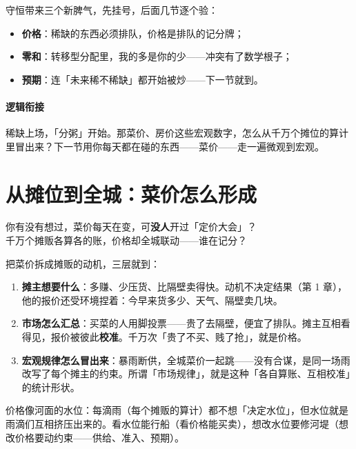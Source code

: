 \documentclass[../../main2.tex]{subfiles}
\begin{document}
守恒带来三个新脾气，先挂号，后面几节逐个验：

\begin{itemize}
	\item \textbf{价格}：稀缺的东西必须排队，价格是排队的记分牌；
	\item \textbf{零和}：转移型分配里，我的多是你的少——冲突有了数学根子；
	\item \textbf{预期}：连「未来稀不稀缺」都开始被炒——下一节就到。
\end{itemize}

\paragraph*{逻辑衔接}
	稀缺上场，「分粥」开始。那菜价、房价这些宏观数字，怎么从千万个摊位的算计里冒出来？下一节用你每天都在碰的东西——菜价——走一遍微观到宏观。

\section{从摊位到全城：菜价怎么形成}

\begin{readingnote}
	你有没有想过，菜价每天在变，可\textbf{没人}开过「定价大会」？\\
	千万个摊贩各算各的账，价格却全城联动——谁在记分？
\end{readingnote}

把菜价拆成摊贩的动机，三层就到：

\begin{enumerate}
	\item \textbf{摊主想要什么}：多赚、少压货、比隔壁卖得快。动机不决定结果（第 1 章），他的报价还受环境捏着：今早来货多少、天气、隔壁卖几块。
	\item \textbf{市场怎么汇总}：买菜的人用脚投票——贵了去隔壁，便宜了排队。摊主互相看得见，报价被彼此\textbf{校准}。千万次「贵了不买、贱了抢」，就是价格。
	\item \textbf{宏观规律怎么冒出来}：暴雨断供，全城菜价一起跳——没有合谋，是同一场雨改写了每个摊主的约束。所谓「市场规律」，就是这种「各自算账、互相校准」的统计形状。
\end{enumerate}

\begin{tcolorbox}[colback=green!5, title=\textit{生活类比}]
	价格像河面的水位：每滴雨（每个摊贩的算计）都不想「决定水位」，但水位就是雨滴们互相挤压出来的。看水位能行船（看价格能买卖），想改水位要修河堤（想改价格要动约束——供给、准入、预期）。
\end{tcolorbox}
\end{document}
